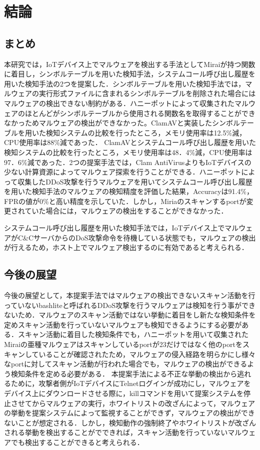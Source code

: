 \chapter{結論}

\section{まとめ}
本研究では，IoTデバイス上でマルウェアを検出する手法としてMiraiが持つ関数に着目し，シンボルテーブルを用いた検知手法，システムコール呼び出し履歴を用いた検知手法の2つを提案した．シンボルテーブルを用いた検知手法では，マルウェアの実行形式ファイルに含まれるシンボルテーブルを削除された場合にはマルウェアの検出できない制約がある．ハニーポットによって収集されたマルウェアのほとんどがシンボルテーブルから使用される関数名を取得することができなかっためマルウェアの検出ができなかった。ClamAVと実装したシンボルテーブルを用いた検知システムの比較を行ったところ，メモリ使用率は12.5\%減，CPU使用率は88\%減であった．
ClamAVとシステムコール呼び出し履歴を用いた検知システムの比較を行ったところ，メモリ使用率は48．4\%減，CPU使用率は97．6\%減であった．2つの提案手法では，Clam AntiVirusよりもIoTデバイスの少ない計算資源によってマルウェア探索を行うことができる．ハニーポットによって収集したDDoS攻撃を行うマルウェアを用いてシステムコール呼び出し履歴を用いた検知手法のマルウェアの検知精度を評価した結果，Accuracyは91.4\%，FPRの値が0\%と高い精度を示していた．しかし，Miriaのスキャンするportが変更されていた場合には，マルウェアの検出をすることができなかった．\par
システムコール呼び出し履歴を用いた検知手法では，IoTデバイス上でマルウェアがC\&CサーバからのDoS攻撃命令を待機している状態でも，マルウェアの検出が行えるため，ホスト上でマルウェア検出するのに有効であると考えられる．

\section{今後の展望}
今後の展望として，本提案手法ではマルウェアの検出できないスキャン活動を行っていないbashliteと呼ばれるDDoS攻撃を行うマルウェアは検知を行う事ができないため．マルウェアのスキャン活動ではない挙動に着目をし新たな検知条件を定めスキャン活動を行っていないマルウェアも検知できるようにする必要がある．スキャン活動に着目した検知条件でも，ハニーポットを用いて収集されたMiraiの亜種マルウェアはスキャンしているportが23だけではなく他のportをスキャンしていることが確認されたため，マルウェアの侵入経路を明らかにし様々なportに対してスキャン活動が行われた場合でも，マルウェアの検出ができるよう検知条件を定める必要がある．
本提案手法による不正な挙動の検出から逃れるために，攻撃者側がIoTデバイスにTelnetログインが成功にし，マルウェアをデバイス上にダウンロードさせる際に，killコマンドを用いて提案システムを停止させてからマルウェアの実行，ホワイトリストの改ざんによって，マルウェアの挙動を提案システムによって監視することができず，マルウェアの検出ができないことが想定される．しかし，検知動作の強制終了やホワイトリストが改ざんされる挙動を検出することがでできれば，スキャン活動を行っていないマルウェアでも検出することができると考えられる．
